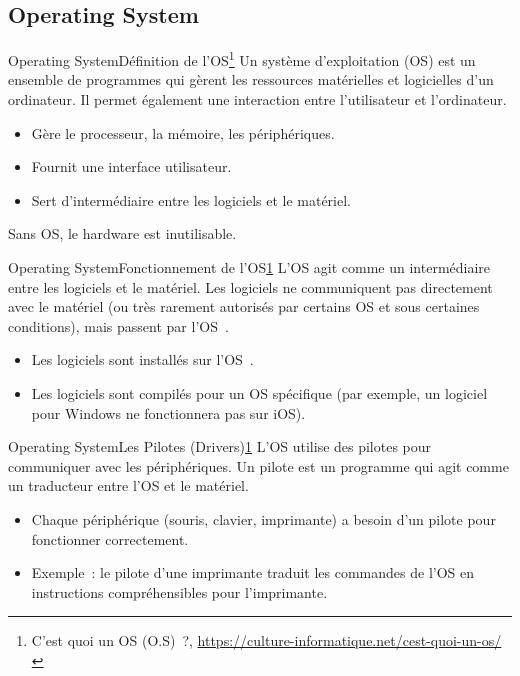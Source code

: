 \documentclass{beamer}
\begin{document}
    \subsection{Operating System}\label{subsec:os}

    \begin{frame}{Operating System}{Définition de l'OS\footnote{\label{os}C’est quoi un OS (O.S)~?, \url{https://culture-informatique.net/cest-quoi-un-os/}}}
        Un système d'exploitation (OS) est un ensemble de programmes qui gèrent les ressources matérielles et logicielles d'un ordinateur.
        Il permet également une interaction entre l'utilisateur et l'ordinateur.
        \begin{itemize}
            \item Gère le processeur, la mémoire, les périphériques.
            \item Fournit une interface utilisateur.
            \item Sert d'intermédiaire entre les logiciels et le matériel.
        \end{itemize}
        \bigbreak
        Sans OS, le hardware est inutilisable.
    \end{frame}

    \begin{frame}{Operating System}{Fonctionnement de l'OS\cref{os}}
        L'OS agit comme un intermédiaire entre les logiciels et le matériel.
        Les logiciels ne communiquent pas directement avec le matériel (ou très rarement autorisés par certains OS et sous certaines conditions), mais passent par l'OS~.
        \begin{itemize}
            \item Les logiciels sont installés sur l'OS~.
            \item Les logiciels sont compilés pour un OS spécifique (par exemple, un logiciel pour Windows ne fonctionnera pas sur iOS).
        \end{itemize}
    \end{frame}

    \begin{frame}{Operating System}{Les Pilotes (Drivers)\cref{os}}
        L'OS utilise des pilotes pour communiquer avec les périphériques.
        Un pilote est un programme qui agit comme un traducteur entre l'OS et le matériel.
        \begin{itemize}
            \item Chaque périphérique (souris, clavier, imprimante) a besoin d'un pilote pour fonctionner correctement.
            \item Exemple~: le pilote d'une imprimante traduit les commandes de l'OS en instructions compréhensibles pour l'imprimante.
        \end{itemize}
    \end{frame}
\end{document}
